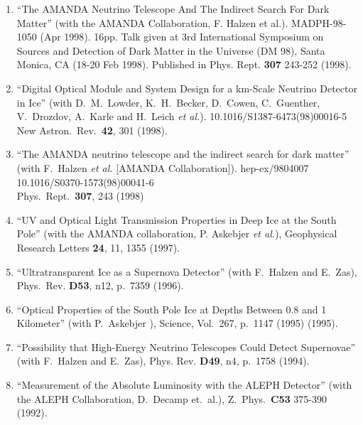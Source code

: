 \begin{enumerate}
\item ``The AMANDA Neutrino Telescope And The Indirect
        Search For Dark   Matter'' (with the AMANDA
        Collaboration, F. Halzen et   al.). MADPH-98-1050
        (Apr 1998). 16pp.  Talk given at 3rd   International
        Symposium on Sources and Detection of Dark Matter in
        the Universe (DM 98), Santa Monica, CA (18-20 Feb
        1998).  Published   in Phys. Rept. {\bf 307} 243-252
        (1998).

\item ``Digital Optical Module and System Design for a
        km-Scale Neutrino Detector in Ice'' (with
        D.~M.~Lowder, K.~H.~Becker, D.~Cowen, C.~Guenther,
        V.~Drozdov, A.~Karle and H.~Leich {\it et al.}).
        10.1016/S1387-6473(98)00016-5 \\{}New Astron.\ Rev.\
        {\bf 42}, 301 (1998).

\item ``The AMANDA neutrino telescope and the indirect
        search for dark matter'' (with F.~Halzen {\it et
        al.}  [AMANDA Collaboration]). hep-ex/9804007
        \\{}10.1016/S0370-1573(98)00041-6 \\{}Phys.\ Rept.\
        {\bf 307}, 243 (1998) %

\item ``UV and Optical Light Transmission Properties in Deep
        Ice at   the South Pole'' (with the AMANDA
        collaboration, P. Askebjer {\sl et     al.}),
        Geophysical Research Letters {\bf 24}, 11, 1355
        (1997).

\item ``Ultratransparent Ice as a Supernova Detector'' (with
        F.~Halzen   and E.~Zas), Phys.~Rev. {\bf D53}, n12,
        p.~7359 (1996).

\item ``Optical Properties of the South Pole Ice at Depths
        Between 0.8   and 1 Kilometer'' (with P.~Askebjer
        \etal), Science, Vol.~267,   p.~1147 (1995)  (1995).

\item ``Possibility that High-Energy Neutrino Telescopes
        Could Detect   Supernovae'' (with F.~Halzen and
        E.~Zas), Phys. Rev. {\bf D49}, n4,   p.~1758 (1994).

\item ``Measurement of the Absolute Luminosity with the
        ALEPH   Detector'' (with the ALEPH Collaboration,
        D.~Decamp et.~al.),   Z.~Phys.~{\bf C53} 375-390
        (1992).


\end{enumerate}
